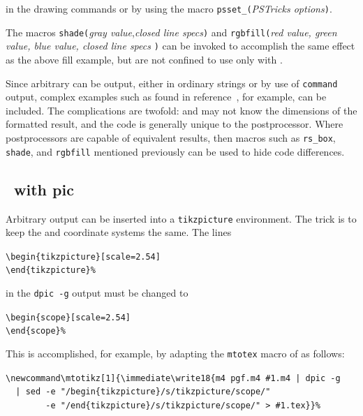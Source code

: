 \noindent%
in the drawing commands or by using the macro
{\tt psset\_(}{\sl PSTricks options}{\tt )}.

The macros
 {\tt shade(}{\sl gray value},{\sl closed line specs}{\tt )}
and
 {\tt rgbfill(}{\sl red value, green value, blue value, closed line specs}%
 {\tt )}
can be invoked to accomplish the same effect as the above fill example, but
are not confined to use only with \PSTricks.

Since arbitrary \latex can be output, either in ordinary strings or by
use of {\tt command} output, complex examples such as found in
reference~\cite{Girou94},
for example, can be included.  The complications
are twofold: \latex and \dpic may not know the dimensions of the formatted
result, and the code is generally unique to the postprocessor.
Where postprocessors are capable of equivalent results, then
macros such as {\tt rs\_box}, {\tt shade}, and {\tt rgbfill} mentioned
previously can be used to hide code differences.

\subsection{\Tikz\ with pic}\label{Tikzwithpic:}
Arbitrary \pic output can be inserted into a {\tt \bsl{}tikzpicture} 
environment.  The trick is to keep the \pic and \Tikz coordinate systems
the same.
The lines

\vspace{\parsep}
\noindent\verb|\begin{tikzpicture}[scale=2.54]|\\
\noindent\verb|\end{tikzpicture}%|
\vspace{\parsep}

\noindent in the {\tt dpic -g} output must be changed to

\vspace{\parsep}
\noindent\verb|\begin{scope}[scale=2.54]|\\
\noindent\verb|\end{scope}%|
\vspace{\parsep}

This is accomplished, for example, by adapting the {\tt \bsl{}mtotex}
macro of  as follows:

\vspace{\parsep}
\noindent
\verb^\newcommand\mtotikz[1]{\immediate\write18{m4 pgf.m4 #1.m4 | dpic -g^\\
\verb^  | sed -e "/begin{tikzpicture}/s/tikzpicture/scope/"^\\
\verb^        -e "/end{tikzpicture}/s/tikzpicture/scope/" > #1.tex}}%^\break

